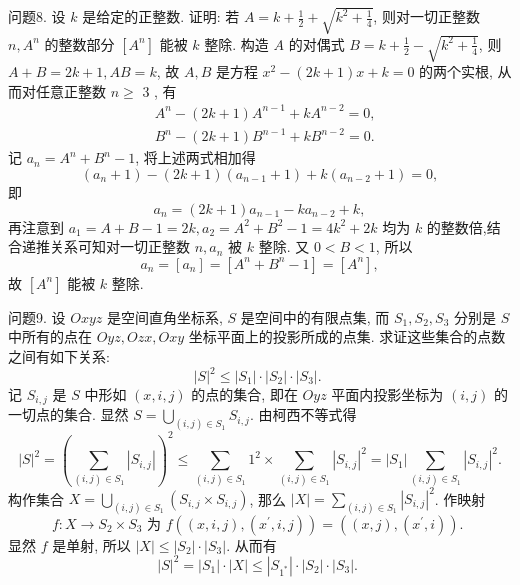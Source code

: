 问题8. 设 $k$ 是给定的正整数.
证明: 若 $A=k+\frac{1}{2}+\sqrt{k^2+\frac{1}{4}}$, 则对一切正整数 $n, A^n$ 的整数部分 $\left[A^n\right]$ 能被 $k$ 整除.
构造 $A$ 的对偶式 $B=k+\frac{1}{2}-\sqrt{k^2+\frac{1}{4}}$, 则 $A+B=2 k+1, A B= k$, 故 $A, B$ 是方程 $x^2-(2 k+1) x+k=0$ 的两个实根, 从而对任意正整数 $n \geqslant$ 3 , 有
$$
\begin{aligned}
& A^n-(2 k+1) A^{n-1}+k A^{n-2}=0, \\
& B^n-(2 k+1) B^{n-1}+k B^{n-2}=0 .
\end{aligned}
$$
记 $a_n=A^n+B^n-1$, 将上述两式相加得
$$
\left(a_n+1\right)-(2 k+1)\left(a_{n-1}+1\right)+k\left(a_{n-2}+1\right)=0,
$$
即
$$
a_n=(2 k+1) a_{n-1}-k a_{n-2}+k, \label{eq1}
$$
再注意到 $a_1=A+B-1=2 k, a_2=A^2+B^2-1=4 k^2+2 k$ 均为 $k$ 的整数倍,结合递推关系可知对一切正整数 $n, a_n$ 被 $k$ 整除.
又 $0<B<1$, 所以
$$
a_n=\left[a_n\right]=\left[A^n+B^n-1\right]=\left[A^n\right],
$$
故 $\left[A^n\right]$ 能被 $k$ 整除.



问题9. 设 $O x y z$ 是空间直角坐标系, $S$ 是空间中的有限点集, 而 $S_1, S_2, S_3$ 分别是 $S$ 中所有的点在 $O y z, O z x, O x y$ 坐标平面上的投影所成的点集.
求证这些集合的点数之间有如下关系:
$$
|S|^2 \leqslant\left|S_1\right| \cdot\left|S_2\right| \cdot\left|S_3\right| \text {. }
$$
记 $S_{i, j}$ 是 $S$ 中形如 $(x, i, j)$ 的点的集合, 即在 $O y z$ 平面内投影坐标为 $(i, j)$ 的一切点的集合.
显然 $S=\bigcup_{(i, j) \in S_1} S_{i, j}$. 由柯西不等式得
$$
|S|^2=\left(\sum_{(i, j) \in S_1}\left|S_{i, j}\right|\right)^2 \leqslant \sum_{(i, j) \in S_1} 1^2 \times \sum_{(i, j) \in S_1}\left|S_{i, j}\right|^2=\left|S_1\right| \sum_{(i, j) \in S_1}\left|S_{i, j}\right|^2 .
$$
构作集合 $X=\bigcup_{(i, j) \in S_1}\left(S_{i, j} \times S_{i, j}\right)$, 那么 $|X|=\sum_{(i, j) \in S_1}\left|S_{i, j}\right|^2$.
作映射
$$
f: X \rightarrow S_2 \times S_3 \text { 为 } f\left((x, i, j),\left(x^{\prime}, i, j\right)\right)=\left((x, j),\left(x^{\prime}, i\right)\right) \text {. }
$$
显然 $f$ 是单射, 所以 $|X| \leqslant\left|S_2\right| \cdot\left|S_3\right|$. 从而有
$$
|S|^2=\left|S_1\right| \cdot|X| \leqslant\left|S_{1^*}\right| \cdot\left|S_2\right| \cdot\left|S_3\right| \text {. }
$$


